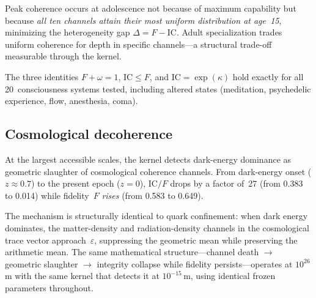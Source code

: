 \documentclass[11pt]{article}
\newcommand{\eps}{\varepsilon}
\newcommand{\IC}{\mathrm{IC}}
\begin{document}
Peak coherence occurs at adolescence not because of maximum
capability but because \emph{all ten channels attain their most
uniform distribution at age~15}, minimizing the heterogeneity gap
$\Delta = F - \IC$. Adult specialization trades uniform coherence
for depth in specific channels---a structural trade-off
measurable through the kernel.

The three identities $F + \omega = 1$, $\IC \leq F$, and
$\IC = \exp(\kappa)$ hold exactly for all 20~consciousness systems
tested, including altered states (meditation, psychedelic
experience, flow, anesthesia, coma).

\subsection{Cosmological decoherence}
\label{sec:cosmo}

At the largest accessible scales, the kernel detects dark-energy
dominance as geometric slaughter of cosmological coherence
channels. From dark-energy onset ($z \approx 0.7$) to the
present epoch ($z = 0$), $\IC/F$ drops by a factor of~27 (from
0.383 to 0.014) while fidelity~$F$ \emph{rises} (from 0.583 to
0.649).

The mechanism is structurally identical to quark confinement:
when dark energy dominates, the matter-density and
radiation-density channels in the cosmological trace vector
approach~$\eps$, suppressing the geometric mean while preserving
the arithmetic mean. The same mathematical
structure---channel death $\to$ geometric slaughter $\to$ integrity
collapse while fidelity persists---operates at $10^{26}$\,m
with the same kernel that detects it at $10^{-15}$\,m, using
identical frozen parameters throughout.
\end{document}
